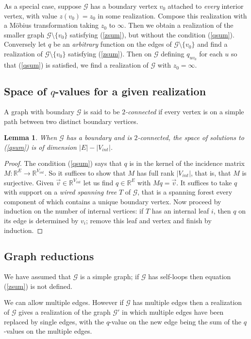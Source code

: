 \documentclass[12pt]{amsart}
\newtheorem{lemma}[theorem]{Lemma}
\newcommand{\R}{{\mathbb R}}
\newcommand{\G}{{\mathcal G}}
\begin{document}
As a special case, suppose $\G$ has a boundary vertex $v_0$ attached to \emph{every} interior vertex, with value $z(v_0)=z_0$ in some realization.
Compose this realization with a M\"obius transformation taking $z_0$ to $\infty$. 
Then we obtain a realization of the smaller graph
$\G\setminus\{v_0\}$ satisfying (\ref{zsum}), but without the condition (\ref{qsum}).
Conversely let $q$ be an \emph{arbitrary} function on the edges of $\G\setminus\{v_0\}$ 
and find a realization of $\G\setminus\{v_0\}$ 
satisfying (\ref{zsum}). Then on $\G$  defining $q_{uv_0}$ for each $u$ so that (\ref{qsum}) is satisfied,
we find a realization of $\G$ with $z_0=\infty$. 



\subsection{Space of $q$-values for a given realization}
A graph with boundary $\G$ is said to be \emph{$2$-connected} if every vertex is on a simple 
path between two distinct boundary vertices.

\begin{lemma}\label{fullrank} When $\G$ has a boundary and is $2$-connected, the space of solutions to (\ref{qsum}) is of dimension $|E|-|V_{int}|$.
\end{lemma}

\begin{proof}
The condition (\ref{qsum}) says that $q$ is in the kernel of the incidence matrix $M:\R^E\to\R^{V_{int}}$. 
So it suffices to show that $M$ has full rank $|V_{int}|$, that is, that $M$ is surjective.
Given $\vec{v}\in\R^{V_{int}}$ let us find $q\in\R^E$ with $Mq=\vec{v}$.
It suffices to take $q$ with support on a \emph{wired spanning tree} $T$ of $\G$, that is a spanning forest every component of which 
contains a unique boundary vertex. Now proceed by induction
on the number of internal vertices: if $T$ has an internal leaf $i$, then $q$ on its edge is determined by $v_i$; 
remove this leaf and vertex and finish by induction.
\end{proof}

\subsection{Graph reductions}
We have assumed that $\G$ is a simple graph;  if $\G$ has self-loops then equation (\ref{zsum}) is not defined.

We can allow multiple edges. However if $\G$ has multiple edges then a realization of $\G$ gives a realization of the 
graph $\G'$ 
in which multiple edges have been replaced
by single edges, with the $q$-value on the new edge being the sum of the $q$-values on the multiple edges.
\end{document}
